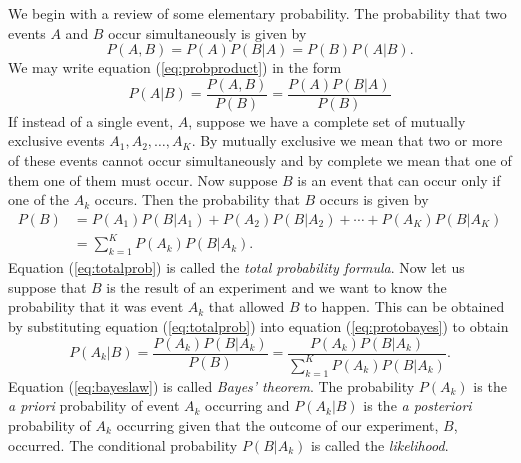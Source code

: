 We begin with a review of some elementary probability.  The probability that
two events $A$ and $B$ occur simultaneously is given by
\begin{equation}
P(A,B) = P(A) P(B|A) = P(B) P(A|B).
\label{eq:probproduct}
\end{equation}
We may write equation (\ref{eq:probproduct}) in the form
\begin{equation}
P(A|B) = \frac{P(A,B)}{P(B)} = \frac{P(A)P(B|A)}{P(B)}
\label{eq:protobayes}
\end{equation}
If instead of a single event, $A$, suppose we have a complete set of mutually
exclusive events $A_1, A_2, \ldots, A_K$. By mutually exclusive we mean that
two or more of these events cannot occur simultaneously and by complete we
mean that one of them one of them must occur. Now suppose $B$ is an event that
can occur only if one of the $A_k$ occurs. Then the probability that $B$
occurs is given by
\begin{equation}
\begin{split}
P(B) &= P(A_1)P(B|A_1) + P(A_2)P(B|A_2) + \cdots + P(A_K)P(B|A_K) \\
     &= \sum_{k=1}^K P(A_k)P(B|A_k).
\end{split}
\label{eq:totalprob}
\end{equation}
Equation (\ref{eq:totalprob}) is called the \emph{total probability formula}.
Now let us suppose that $B$ is the result of an experiment and we want to know
the probability that it was event $A_k$ that allowed $B$ to happen. This can
be obtained by substituting equation (\ref{eq:totalprob}) into equation
(\ref{eq:protobayes}) to obtain
\begin{equation}
P(A_k|B) = \frac{P(A_k)P(B|A_k)}{P(B)} 
= \frac{P(A_k)P(B|A_k)}{\sum_{k=1}^K P(A_k)P(B|A_k)}.
\label{eq:bayeslaw}
\end{equation}
Equation (\ref{eq:bayeslaw}) is called \emph{Bayes' theorem}. The probability
$P(A_k)$ is the \emph{a priori} probability of event $A_k$ occurring and
$P(A_k|B)$ is the \emph{a posteriori} probability of $A_k$ occurring given
that the outcome of our experiment, $B$, occurred. The conditional probability
$P(B|A_k)$ is called the \emph{likelihood}.

